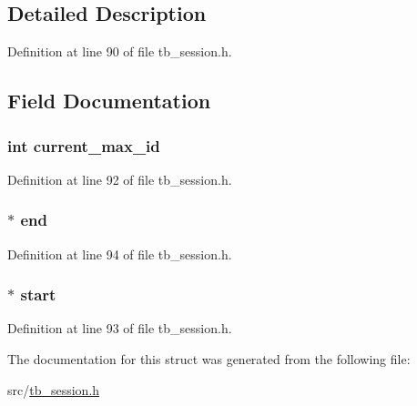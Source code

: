 \subsection{Detailed Description}


Definition at line 90 of file tb\-\_\-session.\-h.



\subsection{Field Documentation}
\hypertarget{structtb__session__list__t_a07d174b6514e5b02a3aa97ddc357d062}{
\subsubsection[{current\-\_\-max\-\_\-id}]{\setlength{\rightskip}{0pt plus 5cm}int current\-\_\-max\-\_\-id}}\label{structtb__session__list__t_a07d174b6514e5b02a3aa97ddc357d062}


Definition at line 92 of file tb\-\_\-session.\-h.

\hypertarget{structtb__session__list__t_aab7b6dca3cae04438a12695d690d54c7}{
\subsubsection[{end}]{$\ast$ end}}\label{structtb__session__list__t_aab7b6dca3cae04438a12695d690d54c7}


Definition at line 94 of file tb\-\_\-session.\-h.

\hypertarget{structtb__session__list__t_ae4ef1c5e563343eb946a3fe31c28be31}{
\subsubsection[{start}]{$\ast$ start}}\label{structtb__session__list__t_ae4ef1c5e563343eb946a3fe31c28be31}


Definition at line 93 of file tb\-\_\-session.\-h.



The documentation for this struct was generated from the following file\-:\begin{DoxyCompactItemize}
\item 
src/\hyperlink{tb__session_8h}{tb\-\_\-session.\-h}\end{DoxyCompactItemize}

